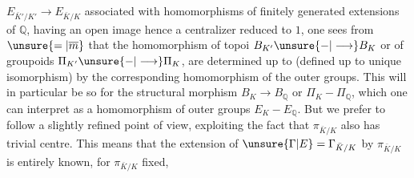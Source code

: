 $E_{\bar K'/K'}\longrightarrow E_{\bar K/K}$ associated with homomorphisms  of finitely generated extensions of $\mathbb Q$, having an open image hence a centralizer reduced to $1$, one sees from $\unsure{=|\overline m}$ that the homomorphism of topoi $B_{K'}\unsure{-|\longrightarrow}B_K$ or of groupoids $\Pi_{K'}\unsure{-|\longrightarrow}\Pi_K$, are determined up to  (defined up to unique isomorphism) by the corresponding homomorphism of the outer groups. This will in particular be so for the structural morphism $B_K\longrightarrow B_{\mathbb Q}$ or $\Pi_K-\Pi_{\mathbb Q}$, which one can interpret  as a homomorphism of outer  groups $E_K-E_{\mathbb Q}$. But we prefer to follow a slightly refined point of view, exploiting the fact that $\pi_{\bar K/K}$ also has trivial centre. This means that the extension of $\unsure{\Gamma|E}=\Gamma_{\bar K/K}$ by $\pi_{\bar K/K}$ is entirely known,  for $\pi_{\bar K/K}$  fixed,
